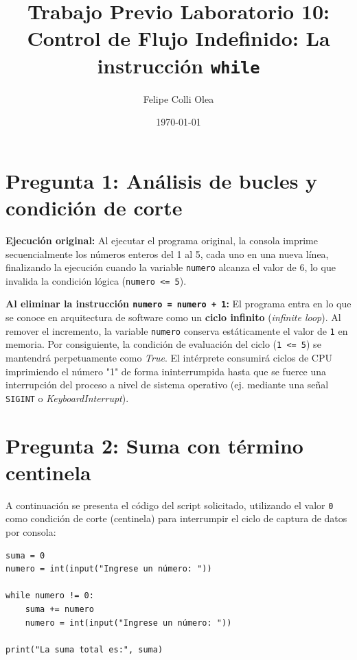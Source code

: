 \documentclass[11pt]{article}
\title{Trabajo Previo Laboratorio 10: \\ \large{Control de Flujo Indefinido: La instrucción \texttt{while}}}
\author{Felipe Colli Olea}
\date{\today}
\begin{document}
\maketitle
\thispagestyle{fancy}

\section*{Pregunta 1: Análisis de bucles y condición de corte}

\textbf{Ejecución original:} Al ejecutar el programa original, la consola imprime secuencialmente los números enteros del 1 al 5, cada uno en una nueva línea, finalizando la ejecución cuando la variable \texttt{numero} alcanza el valor de 6, lo que invalida la condición lógica (\texttt{numero <= 5}).

\vspace{0.3cm}
\textbf{Al eliminar la instrucción \texttt{numero = numero + 1}:} El programa entra en lo que se conoce en arquitectura de software como un \textbf{ciclo infinito} (\textit{infinite loop}). Al remover el incremento, la variable \texttt{numero} conserva estáticamente el valor de \texttt{1} en memoria. Por consiguiente, la condición de evaluación del ciclo (\texttt{1 <= 5}) se mantendrá perpetuamente como \textit{True}. El intérprete consumirá ciclos de CPU imprimiendo el número "1" de forma ininterrumpida hasta que se fuerce una interrupción del proceso a nivel de sistema operativo (ej. mediante una señal \texttt{SIGINT} o \textit{KeyboardInterrupt}).

\section*{Pregunta 2: Suma con término centinela}

A continuación se presenta el código del script solicitado, utilizando el valor \texttt{0} como condición de corte (centinela) para interrumpir el ciclo de captura de datos por consola:

\begin{verbatim}
suma = 0
numero = int(input("Ingrese un número: "))

while numero != 0:
    suma += numero
    numero = int(input("Ingrese un número: "))

print("La suma total es:", suma)
\end{verbatim}
\end{document}
